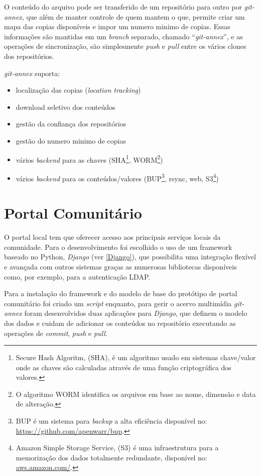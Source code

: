 O conteúdo do arquivo pode ser transferido de um repositório para
outro por \emph{git-annex}, que além de manter controle de quem mantem
o que, permite criar um mapa das copias disponíveis e impor um numero
minimo de copias. Essas informações são mantidas em um \emph{branch}
separado, chamado ``\emph{git-annex}'', e as operações de
sincronização, são simplesmente \emph{push} e \emph{pull} entre os
vários clones dos repositórios.

\emph{git-annex} suporta:
\begin{itemize}
\item localização das copias (\emph{location tracking})
\item download seletivo dos conteúdos 
\item gestão da confiança dos repositórios
\item gestão do numero minimo de copias
\item vários \emph{backend} para as chaves (SHA\footnote{Secure Hash
    Algoritm, (SHA), é um algoritmo usado em sistemas chave/valor onde
    as chaves são calculadas através de uma função criptográfica dos
    valores.}, WORM\footnote{O algoritmo WORM identifica os arquivos
    em base ao nome, dimensão e data de alteração.})
\item vários \emph{backend} para os conteúdos/valores
  (BUP\footnote{BUP é um sistema para \emph{backup} a alta eficiência
    disponível no: \url{https://github.com/apenwarr/bup}.}, rsync,
  web, S3\footnote{Amazon Simple Storage Service, (S3) é uma
    infraestrutura para a memorização dos dados totalmente redundante,
    disponível no: \url{aws.amazon.com/}.})
\end{itemize}

\section{Portal Comunitário}
O portal local tem que oferecer acesso aos principais serviços locais
da comunidade. Para o desenvolvimento foi escolhido o uso de um
framework baseado no Python, \emph{Django} (ver \ref{Django}), que
possibilita uma integração flexível e avançada com outros sistemas
graças as numerosas bibliotecas disponíveis como, por exemplo, para a
autenticação LDAP.

Para a instalação do framework e do modelo de base do protótipo de
portal comunitário foi criado um \emph{script} enquanto, para gerir o
acervo multimídia \emph{git-annex} foram desenvolvidos duas aplicações
para \emph{Django}, que definem o modelo dos dados e cuidam de
adicionar os conteúdos no repositório executando as operações de
\emph{commit}, \emph{push} e \emph{pull}.


